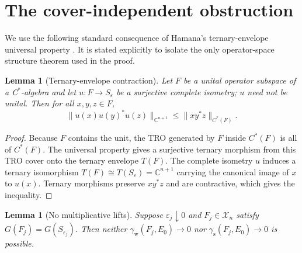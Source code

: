 \documentclass[11pt]{article}
\newtheorem{lemma}[theorem]{Lemma}
\newcommand{\C}{\mathbb C}
\newcommand{\Xc}{\mathcal X}
\newcommand{\eps}{\varepsilon}
\newcommand{\gamw}{\gamma_{\mathrm w}}
\newcommand{\gams}{\gamma_{\mathrm s}}
\begin{document}
\section{The cover-independent obstruction}

We use the following standard consequence of Hamana's ternary-envelope
universal property \cite{Hamana}. It is stated explicitly to isolate the only
operator-space structure theorem used in the proof.

\begin{lemma}[Ternary-envelope contraction]\label{lem:ternary}
Let $F$ be a unital operator subspace of a C$^*$-algebra and let
$u:F\to S_\eps$ be a surjective complete isometry; $u$ need not be unital.
Then for all $x,y,z\in F$,
\[
\|u(x)u(y)^*u(z)\|_{\C^{n+1}}
\leq \|xy^*z\|_{C^*(F)}.
\]
\end{lemma}

\begin{proof}
Because $F$ contains the unit, the TRO generated by $F$ inside $C^*(F)$ is
all of $C^*(F)$. The universal property gives a surjective ternary morphism
from this TRO cover onto the ternary envelope $T(F)$. The complete isometry
$u$ induces a ternary isomorphism $T(F)\cong T(S_\eps)=\C^{n+1}$ carrying the
canonical image of $x$ to $u(x)$. Ternary morphisms preserve $xy^*z$ and are
contractive, which gives the inequality.
\end{proof}

\begin{lemma}[No multiplicative lifts]\label{lem:obstruction}
Suppose $\eps_j\downarrow0$ and $F_j\in\Xc_n$ satisfy
$G(F_j)=G(S_{\eps_j})$. Then neither
$\gamw(F_j,E_0)\to0$ nor $\gams(F_j,E_0)\to0$ is possible.
\end{lemma}
\end{document}
